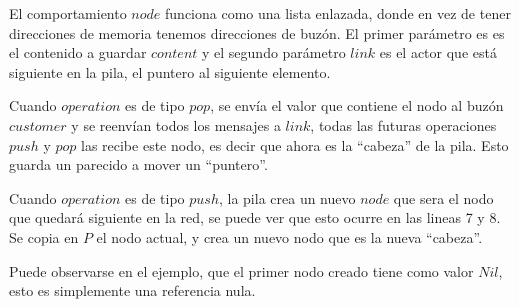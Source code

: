 El comportamiento $node$ funciona como una lista enlazada, donde en vez de tener direcciones de memoria tenemos direcciones de buzón. El primer parámetro es es el contenido a guardar $content$ y el segundo parámetro $link$ es el actor que está siguiente en la pila, el puntero al siguiente elemento.

Cuando $operation$ es de tipo $pop$, se envía el valor que contiene el nodo al buzón $customer$ y se reenvían todos los mensajes a $link$, todas las futuras operaciones $push$ y $pop$ las recibe este nodo, es decir que ahora es la ``cabeza'' de la pila. Esto guarda un parecido a mover un ``puntero''.

Cuando $operation$ es de tipo $push$, la pila crea un nuevo $node$ que sera el nodo que quedará siguiente en la red, se puede ver que esto ocurre en las lineas 7 y 8. Se copia en $P$ el nodo actual, y crea un nuevo nodo que es la nueva ``cabeza''.

Puede observarse en el ejemplo, que el primer nodo creado tiene como valor $Nil$, esto es simplemente una referencia nula. 